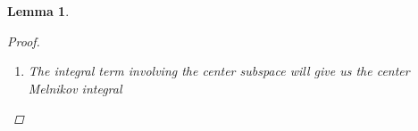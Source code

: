 \documentclass[12pt]{article}
\newtheorem{lemma}{Lemma}
\begin{document}
\begin{lemma}
\begin{proof}
\begin{enumerate}
\begin{align*}
\langle \Psi(0), &P^-(0) P_0^c(0) e^{\nu(\lambda) X_{i-1}} c_{i-1}^- - P^+(0) P_0^c(0) e^{-\nu(\lambda)X_i} c_i^+) = e^{\nu(\lambda) X_{i-1}} c_{i-1}^- - e^{-\nu(\lambda)X_i} c_i^+ 
\end{align*}

For the higher order terms involving $c$, from the previous section we have
\begin{align*}
|(P_i^-(0; \lambda) &- P^-(0)) P_0^c(0) e^{\nu(\lambda) X_{i-1}} c_{i-1}^- + P_i^-(0; \lambda) (P_0^c(\lambda) - P_0^c(0)) e^{\nu(\lambda) X_{i-1}} c_{i-1}^-| \\
&\leq C (|\lambda| + e^{-\alpha X_m}) |e^{\nu(\lambda) X_{i-1}} c_{i-1}^-|\\
&= C (|\lambda| + e^{-\alpha X_m}) |\tilde{c}_{i-1}^+|
\end{align*}

and

\begin{align*}
|(P_i^+(0; \lambda) &- P^+(0))P_0^c(0) e^{-\nu(\lambda)X_i} c_i^+ + P_i^+(0; \lambda) (P_0^c(\lambda) - P_0^c(0)) e^{-\nu(\lambda)X_i} c_i^+| \\
&\leq C (|\lambda| + e^{-\alpha X_m}) |e^{-\nu(\lambda)X_i} c_i^+|
\end{align*}

All that remains is to write $e^{-\nu(\lambda)X_i} c_i^+$ in terms of $e^{-\nu(\lambda)X_i} c_i^-$ using Lemma \ref{inv2}. For the term $e^{-\nu(\lambda)X_i} c_i^+$ we have, from Lemma \ref{inv2},


Doing that, the terms involving the $c_i$ are given by

\begin{align*}
e^{\nu(\lambda) X_{i-1} } &c_{i-1}^- - e^{-\nu(\lambda)X_i} c_i^- + \mathcal{O}\Big( (|\lambda| + e^{-\alpha X_m})(|\tilde{c}_{i-1}^+| + |\tilde{c}_i^-|) + e^{-\tilde{\alpha}X_m} (|\lambda| + e^{-\tilde{\alpha}X_m})|\tilde{c}_{i+1}^-| \\
&+ e^{-\tilde{\alpha}X_i}|c_i^-|
+ e^{-\tilde{\alpha}X_m}( e^{-\alpha X_{i-1}}|c_{i-1}^-| + e^{-\alpha X_{i+1}}|c_{i+1}^-| ) + e^{-\tilde{\alpha}X_m}(|\lambda| + |D_i|)|d| \Big)  
\end{align*}

\item The integral term involving the center subspace will give us the center Melnikov integral


\end{enumerate}
\end{proof}
\end{lemma}
\end{document}
